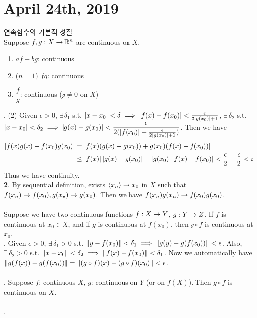 \section*{April 24th, 2019}
연속함수의 기본적 성질\\
 Suppose $f, g:X\rightarrow \mathbb{R}^n$ are continuous on $X$.
\begin{enumerate}
	\item $af+bg$: continuous
	\item ($n= 1$) $fg$: continuous
	\item $\dfrac{f}{g}$: continuous ($g\neq 0$ on $X$)
\end{enumerate}
\pf. (2) Given $\epsilon >0$, $\exists\,\delta_1$ s.t. $\left|x- x_0\right|<\delta \implies \left|f(x) - f(x_0)\right| < \frac{\epsilon}{2\left|g(x_0)\right| + 1}$, $\exists\,\delta_2$ s.t. $\left|x-x_0\right| < \delta_2 \implies \left|g(x) - g(x_0)\right| < \dfrac{\epsilon}{2(\left|f(x_0)\right| + \frac{\epsilon}{2\left|g(x_0)\right| + 1})}$. Then we have $$\begin{aligned}
	\left|f(x)g(x) - f(x_0)g(x_0)\right| &= \left|f(x)(g(x)-g(x_0)) + g(x_0)(f(x) - f(x_0))\right|\\
	&\leq \left|f(x)\right|\left|g(x)-g(x_0)\right| + \left|g(x_0)\right|\left|f(x) - f(x_0)\right| < \frac{\epsilon}{2} + \frac{\epsilon}{2} < \epsilon
\end{aligned}$$
Thus we have continuity.\\
\pf\textbf{ 2}. By sequential definition, exists $\left\langle x_n \right\rangle \rightarrow x_0$ in $X$ such that $f(x_n) \rightarrow f(x_0), g(x_n)\rightarrow g(x_0)$. Then we have $f(x_n)g(x_n) \rightarrow f(x_0)g(x_0)$.\\
\\
 Suppose we have two continuous functions $f: X\rightarrow Y$, $g: Y\rightarrow Z$. If $f$ is continuous at $x_0\in X$, and if $g$ is continuous at $f(x_0)$, then $g\circ f$ is continuous at $x_0$.\\
\pf. Given $\epsilon > 0$, $\exists\, \delta_1 > 0$ s.t. $\left\lVert y - f(x_0)\right\rVert < \delta_1 \implies \left\lVert g(y) - g(f(x_0))\right\rVert < \epsilon$. Also, $\exists\,\delta_2 > 0$ s.t. $\left\lVert x-  x_0\right\rVert <\delta_2 \implies \left\lVert f(x) - f(x_0)\right\rVert < \delta_1$. Now we automatically have $\left\lVert g(f(x)) - g(f(x_0))\right\rVert  = \left\lVert(g\circ f)(x) - (g\circ f)(x_0)\right\rVert< \epsilon$.\\
\\
\rmk. Suppose $f$: continuous $X$, $g$: continuous on $Y$ (or on $f(X)$). Then $g\circ f$ is continuous on $X$.\\
\\
\ex.
